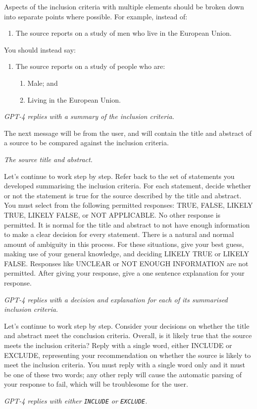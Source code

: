 \documentclass{article}
\begin{document}
\begin{description}
    Aspects of the inclusion criteria with multiple elements should be broken
    down into separate points where possible. For example, instead of:

    \begin{enumerate}[label=\arabic*.\ ]
      \item The source reports on a study of men who live in the European
            Union.
    \end{enumerate}

    You should instead say:

    \begin{enumerate}[label=\arabic*.\ ]
    \item The source reports on a study of people who are:
      \begin{enumerate}[label=\arabic{enumi}\alph*.\ ]
        \item Male; and
        \item Living in the European Union.
      \end{enumerate}
    \end{enumerate}

    \GPT \textit{GPT-4 replies with a summary of the inclusion criteria.}

    \System The next message will be from the user, and will contain the title and abstract of a source to be compared against the inclusion criteria.

    \User \textit{The source title and abstract.}

    \System Let's continue to work step by step. Refer back to the set of statements you developed summarising the inclusion criteria. For each statement, decide whether or not the statement is true for the source described by the title and abstract. You must select from the following permitted responses: TRUE, FALSE, LIKELY TRUE, LIKELY FALSE, or NOT APPLICABLE. No other response is permitted. It is normal for the title and abstract to not have enough information to make a clear decision for every statement. There is a natural and normal amount of ambiguity in this process. For these situations, give your best guess, making use of your general knowledge, and deciding LIKELY TRUE or LIKELY FALSE. Responses like UNCLEAR or NOT ENOUGH INFORMATION are not permitted. After giving your response, give a one sentence explanation for your response.

    \GPT \textit{GPT-4 replies with a decision and explanation for each of its summarised inclusion criteria.}

    \System Let's continue to work step by step. Consider your decisions on whether the title and abstract meet the conclusion criteria. Overall, is it likely true that the source meets the inclusion criteria? Reply with a single word, either INCLUDE or EXCLUDE, representing your recommendation on whether the source is likely to meet the inclusion criteria. You must reply with a single word only and it must be one of these two words; any other reply will cause the automatic parsing of your response to fail, which will be troublesome for the user.

    \GPT \textit{GPT-4 replies with either \texttt{INCLUDE} or \texttt{EXCLUDE}.}

\end{description}
\end{document}
